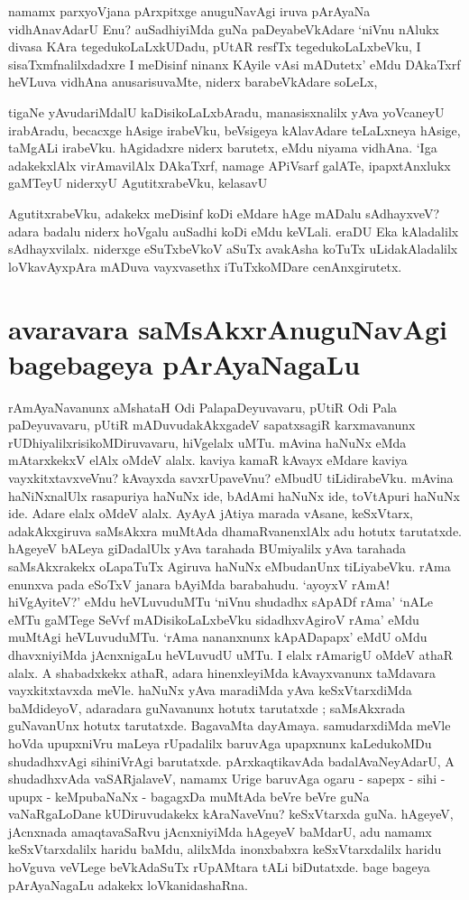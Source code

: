 namamx parxyoVjana pArxpitxge anuguNavAgi iruva pArAyaNa vidhAnavAdarU Enu? auSadhiyiMda guNa paDeyabeVkAdare `niVnu nAlukx divasa KAra tegedukoLaLxkUDadu, pUtAR resfTx tegedukoLaLxbeVku, I sisaTxmfnalilxdadxre I meDisinf ninanx KAyile vAsi mADutetx' eMdu DAkaTxrf heVLuva vidhAna anusarisuvaMte, niderx barabeVkAdare soLeLx, 

tigaNe yAvudariMdalU kaDisikoLaLxbAradu, manasisxnalilx yAva yoVcaneyU irabAradu, becacxge hAsige irabeVku, beVsigeya kAlavAdare teLaLxneya hAsige, taMgALi irabeVku. hAgidadxre niderx barutetx, eMdu niyama vidhAna. `Iga adakekxlAlx virAmavilAlx DAkaTxrf, namage APiVsarf galATe, ipapxtAnxlukx gaMTeyU niderxyU AgutitxrabeVku, kelasavU 

AgutitxrabeVku, adakekx meDisinf koDi eMdare hAge mADalu sAdhayxveV? adara badalu niderx hoVgalu auSadhi koDi eMdu keVLali. eraDU Eka kAladalilx sAdhayxvilalx. niderxge eSuTxbeVkoV aSuTx avakAsha koTuTx uLidakAladalilx loVkavAyxpAra mADuva vayxvasethx iTuTxkoMDare cenAnxgirutetx. 


\section*{avaravara saMsAkxrAnuguNavAgi bagebageya pArAyaNagaLu} 


rAmAyaNavanunx aMshataH Odi PalapaDeyuvavaru, pUtiR Odi Pala paDeyuvavaru, pUtiR mADuvudakAkxgadeV sapatxsagiR karxmavanunx rUDhiyalilxrisikoMDiruvavaru, hiVgelalx uMTu. mAvina haNuNx eMda mAtarxkekxV elAlx oMdeV alalx. kaviya kamaR kAvayx eMdare kaviya vayxkitxtavxveVnu? kAvayxda savxrUpaveVnu? eMbudU tiLidirabeVku. mAvina haNiNxnalUlx rasapuriya haNuNx ide, bAdAmi haNuNx ide, toVtApuri haNuNx ide. Adare elalx oMdeV alalx. AyAyA jAtiya marada vAsane, keSxVtarx, adakAkxgiruva saMsAkxra muMtAda dhamaRvanenxlAlx adu hotutx tarutatxde. hAgeyeV bALeya giDadalUlx yAva tarahada BUmiyalilx yAva tarahada saMsAkxrakekx oLapaTuTx Agiruva haNuNx eMbudanUnx tiLiyabeVku. rAma enunxva pada eSoTxV janara bAyiMda barabahudu. `ayoyxV rAmA! hiVgAyiteV?' eMdu heVLuvuduMTu `niVnu shudadhx sApADf rAma' `nALe eMTu gaMTege SeVvf mADisikoLaLxbeVku sidadhxvAgiroV rAma' eMdu muMtAgi heVLuvuduMTu. `rAma nananxnunx kApADapapx' eMdU oMdu dhavxniyiMda jAcnxnigaLu heVLuvudU uMTu. I elalx rAmarigU oMdeV athaR alalx. A shabadxkekx athaR, adara hinenxleyiMda kAvayxvanunx taMdavara vayxkitxtavxda meVle. haNuNx yAva maradiMda yAva keSxVtarxdiMda baMdideyoV, adaradara guNavanunx hotutx tarutatxde ; saMsAkxrada guNavanUnx hotutx tarutatxde. BagavaMta dayAmaya. samudarxdiMda meVle hoVda upupxniVru maLeya rUpadalilx baruvAga upapxnunx kaLedukoMDu shudadhxvAgi sihiniVrAgi barutatxde. pArxkaqtikavAda badalAvaNeyAdarU, A shudadhxvAda vaSARjalaveV, namamx Urige baruvAga ogaru - sapepx - sihi - upupx - keMpubaNaNx - bagagxDa muMtAda beVre beVre guNa vaNaRgaLoDane kUDiruvudakekx kAraNaveVnu? keSxVtarxda guNa. hAgeyeV, jAcnxnada amaqtavaSaRvu jAcnxniyiMda hAgeyeV baMdarU, adu namamx keSxVtarxdalilx haridu baMdu, alilxMda inonxbabxra keSxVtarxdalilx haridu hoVguva veVLege beVkAdaSuTx rUpAMtara tALi biDutatxde. bage bageya pArAyaNagaLu adakekx loVkanidashaRna. 

